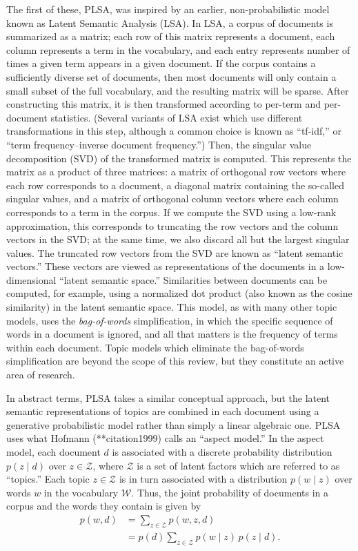 \documentclass{article}
\begin{document}
The first of these, PLSA, was inspired by an earlier, non-probabilistic model known as Latent Semantic Analysis (LSA).
In LSA, a corpus of documents is summarized as a matrix; each row of this matrix represents a document, each column represents a term in the vocabulary, and each entry represents number of times a given term appears in a given document.
If the corpus contains a sufficiently diverse set of documents, then most documents will only contain a small subset of the full vocabulary, and the resulting matrix will be sparse.
After constructing this matrix, it is then transformed according to per-term and per-document statistics.
(Several variants of LSA exist which use different transformations in this step, although a common choice is known as ``tf-idf,'' or ``term frequency--inverse document frequency.'')
Then, the singular value decomposition (SVD) of the transformed matrix is computed.
This represents the matrix as a product of three matrices: a matrix of orthogonal row vectors where each row corresponds to a document, a diagonal matrix containing the so-called singular values, and a matrix of orthogonal column vectors where each column corresponds to a term in the corpus.
If we compute the SVD using a low-rank approximation, this corresponds to truncating the row vectors and the column vectors in the SVD; at the same time, we also discard all but the largest singular values.
The truncated row vectors from the SVD are known as ``latent semantic vectors.''
These vectors are viewed as representations of the documents in a low-dimensional ``latent semantic space.''
Similarities between documents can be computed, for example, using a normalized dot product (also known as the cosine similarity) in the latent semantic space.
This model, as with many other topic models, uses the \emph{bag-of-words} simplification, in which the specific sequence of words in a document is ignored, and all that matters is the frequency of terms within each document.
Topic models which eliminate the bag-of-words simplification are beyond the scope of this review, but they constitute an active area of research.

In abstract terms, PLSA takes a similar conceptual approach, but the latent semantic representations of topics are combined in each document using a generative probabilistic model rather than simply a linear algebraic one.
PLSA uses what Hofmann (**citation1999) calls an ``aspect model.''
In the aspect model, each document $d$ is associated with a discrete probability distribution $p(z \mid d)$ over $z \in \mathcal Z$, where $\mathcal Z$ is a set of latent factors which are referred to as ``topics.''
Each topic $z \in \mathcal Z$ is in turn associated with a distribution $p(w \mid z)$ over words $w$ in the vocabulary $\mathcal W$.
Thus, the joint probability of documents in a corpus and the words they contain is given by
\begin{align*}
p(w, d)
&= \sum_{z \in \mathcal Z} p(w, z, d) \\
&= p(d) \sum_{z \in \mathcal Z} p(w \mid z) \, p(z \mid d).
\end{align*}
\end{document}
